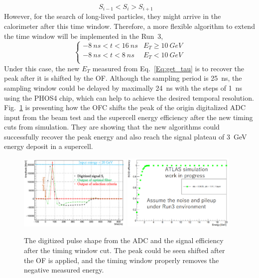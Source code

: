 \begin{equation}
S_{i-1}<S_{i}>S_{i+1}\quad 
\end{equation}
However, for the search of long-lived particles, they might arrive in the calorimeter after this time window. Therefore, a more flexible algorithm to extend the time window will be implemented in the Run~3,
\begin{equation}
\begin{cases}
-8~ns<t<16~ns & E_{T}\geq 10~GeV \\
-8~ns<t<8~ns & E_{T}<10~GeV \\
\end{cases}
\end{equation}
Under this case, the new $E_{T}$ measured from Eq.~\ref{Eq:get_tau} is to recover the peak after it is shifted by the OF. Although the sampling period is 25~ns, the sampling window could be delayed by maximally 24~ns with the steps of 1~ns using the PHOS4 chip\cite{Toifl:1999qv}, which can help to achieve the desired temporal resolution. Fig.~\ref{Fig:OFC} is presenting how the OFC shifts the peak of the origin digitalized ADC input from the beam test and the supercell energy efficiency after the new timing cuts from simulation. They are showing that the new algorithms could successfully recover the peak energy and also reach the signal plateau of 3~GeV energy deposit in a supercell.
\begin{figure}[!h]                
	\includegraphics[width=0.48\textwidth]{Chapter6/Pulse.png}
	\includegraphics[width=0.48\textwidth]{Chapter6/TimeWindow.png}
	\begin{center}
		\caption{The digitized pulse shape from the ADC and the signal efficiency after the timing window cut. The peak could be seen shifted after the OF is applied, and the timing window properly removes the negative measured energy. }
		\label{Fig:OFC}            
	\end{center}
\end{figure}
